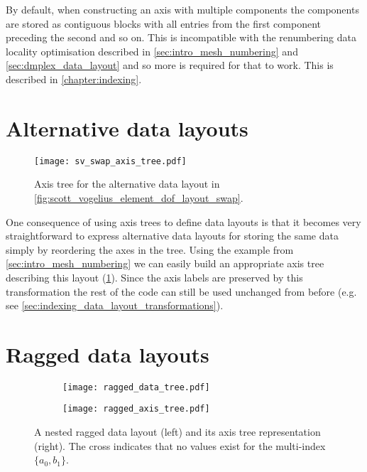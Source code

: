 \documentclass[thesis]{subfiles}
\begin{document}
By default, when constructing an axis with multiple components the components are stored as contiguous blocks with all entries from the first component preceding the second and so on.
This is incompatible with the renumbering data locality optimisation described in \cref{sec:intro_mesh_numbering} and \cref{sec:dmplex_data_layout} and so more is required for that to work.
This is described in \cref{chapter:indexing}.

\section{Alternative data layouts}

\begin{figure}
  \centering
  \texttt{[image: sv\_swap\_axis\_tree.pdf]}
  \caption{
    Axis tree for the alternative data layout in \cref{fig:scott_vogelius_element_dof_layout_swap}.
  }
  \label{fig:axis_tree_swap}
\end{figure}

One consequence of using axis trees to define data layouts is that it becomes very straightforward to express alternative data layouts for storing the same data simply by reordering the axes in the tree.
Using the example from \cref{sec:intro_mesh_numbering} we can easily build an appropriate axis tree describing this layout (\cref{fig:axis_tree_swap}).
Since the axis labels are preserved by this transformation the rest of the code can still be used unchanged from before (e.g. see \cref{sec:indexing_data_layout_transformations}).

\section{Ragged data layouts}

\begin{figure}
  \centering
  \begin{subfigure}{.4\textwidth}
    \centering
    \texttt{[image: ragged\_data\_tree.pdf]}
  \end{subfigure}
  \begin{subfigure}{.4\textwidth}
    \centering
    \texttt{[image: ragged\_axis\_tree.pdf]}
  \end{subfigure}
  \caption{
    A nested ragged data layout (left) and its axis tree representation (right).
    The cross indicates that no values exist for the multi-index $\{a_0, b_1\}$.
  }
  \label{fig:ragged_axis_tree}
\end{figure}
\end{document}
